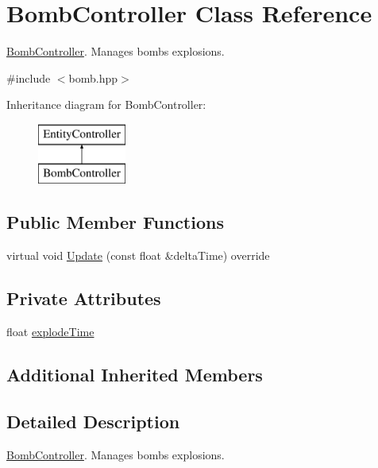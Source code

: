 \hypertarget{class_bomb_controller}{}\section{Bomb\+Controller Class Reference}
\label{class_bomb_controller}


\mbox{\hyperlink{class_bomb_controller}{Bomb\+Controller}}. Manages bombs\textquotesingle{} explosions.  




{\ttfamily \#include $<$bomb.\+hpp$>$}

Inheritance diagram for Bomb\+Controller\+:\begin{figure}[H]
\begin{center}
\leavevmode
\includegraphics[height=2.000000cm]{class_bomb_controller}
\end{center}
\end{figure}
\subsection*{Public Member Functions}
\begin{DoxyCompactItemize}
\item 
virtual void \mbox{\hyperlink{class_bomb_controller_ae84cb29af5b075c6802760105036abeb}{Update}} (const float \&delta\+Time) override
\end{DoxyCompactItemize}
\subsection*{Private Attributes}
\begin{DoxyCompactItemize}
\item 
float \mbox{\hyperlink{class_bomb_controller_a8d957cdfb20acb8df26e4e3009ea37b6}{explode\+Time}}
\end{DoxyCompactItemize}
\subsection*{Additional Inherited Members}


\subsection{Detailed Description}
\mbox{\hyperlink{class_bomb_controller}{Bomb\+Controller}}. Manages bombs\textquotesingle{} explosions. 

